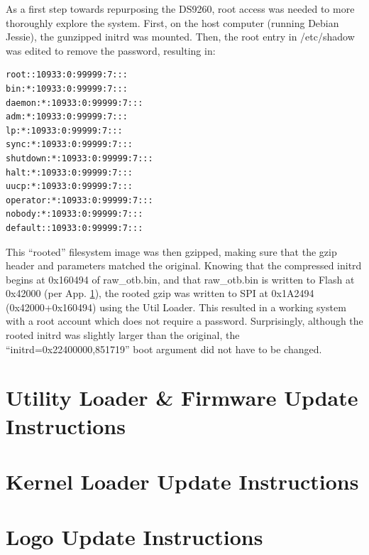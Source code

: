 \documentclass[]{article}
\begin{document}
\par As a first step towards repurposing the DS9260, root access was needed to more thoroughly explore the system. First, on the host computer (running Debian Jessie), the gunzipped initrd was mounted. Then, the root entry in /etc/shadow was edited to remove the password, resulting in:
\begin{verbatim}
root::10933:0:99999:7:::
bin:*:10933:0:99999:7:::
daemon:*:10933:0:99999:7:::
adm:*:10933:0:99999:7:::
lp:*:10933:0:99999:7:::
sync:*:10933:0:99999:7:::
shutdown:*:10933:0:99999:7:::
halt:*:10933:0:99999:7:::
uucp:*:10933:0:99999:7:::
operator:*:10933:0:99999:7:::
nobody:*:10933:0:99999:7:::
default::10933:0:99999:7:::
\end{verbatim}
\par This ``rooted'' filesystem image was then gzipped, making sure that the gzip header and parameters matched the original. Knowing that the compressed initrd begins at 0x160494 of raw\_otb.bin, and that raw\_otb.bin is written to Flash at 0x42000 (per App. \ref{app:utilLoader}), the rooted gzip was written to SPI at 0x1A2494 (0x42000+0x160494) using the Util Loader. This resulted in a working system with a root account which does not require a password. Surprisingly, although the rooted initrd was slightly larger than the original, the ``initrd=0x22400000,851719'' boot argument did not have to be changed. 
\newpage 
\begin{appendices}
	\section{Utility Loader \& Firmware Update Instructions}
		
		\label{app:utilLoader}
	\section{Kernel Loader Update Instructions}
		
	\section{Logo Update Instructions}
		
\end{appendices}
\end{document}

